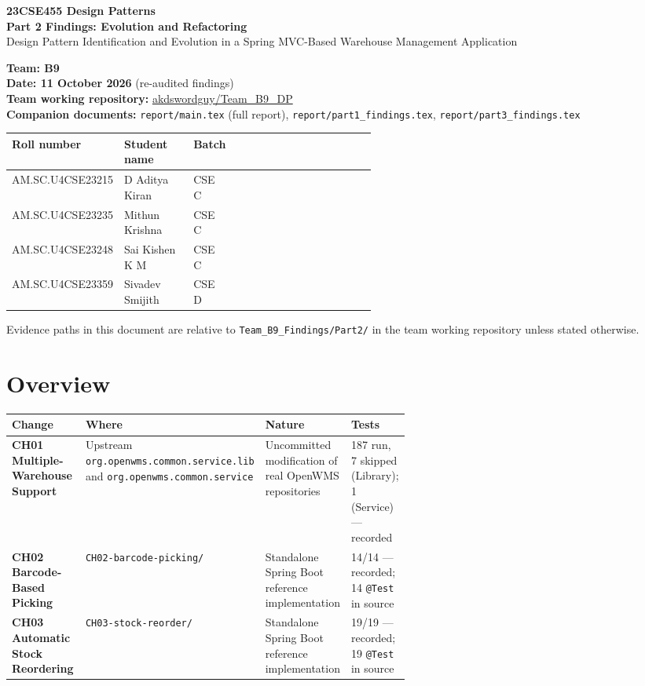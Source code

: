 \documentclass[11pt,a4paper]{article}
\title{}
\author{}
\date{}
\newcommand{\code}[1]{\nolinkurl{#1}}
\begin{document}
\begin{center}
{\Large\textbf{23CSE455 Design Patterns}}\\[4pt]
{\LARGE\textbf{Part 2 Findings: Evolution and Refactoring}}\\[6pt]
{\large Design Pattern Identification and Evolution in a Spring MVC-Based Warehouse Management Application}
\end{center}

\textbf{Team: B9}\\
\textbf{Date: 11 October 2026} (re-audited findings)\\
\textbf{Team working repository:} \href{https://github.com/akdswordguy/Team_B9_DP}{akdswordguy/Team\_B9\_DP}\\
\textbf{Companion documents:} \code{report/main.tex} (full report), \code{report/part1_findings.tex}, \code{report/part3_findings.tex}


\begin{tabularx}{\linewidth}{@{}P{0.25\linewidth}P{0.19\linewidth}P{0.10\linewidth}X@{}}
\toprule
Roll number & Student name & Batch \\
\midrule
AM.SC.U4CSE23215 & D Aditya Kiran & CSE C \\
AM.SC.U4CSE23235 & Mithun Krishna & CSE C \\
AM.SC.U4CSE23248 & Sai Kishen K M & CSE C\\
AM.SC.U4CSE23359 & Sivadev Smijith & CSE D \\
\bottomrule
\end{tabularx}

Evidence paths in this document are relative to \code{Team_B9_Findings/Part2/} in the team working repository unless stated otherwise.

\section{Overview}

\begin{tabularx}{\linewidth}{@{}P{0.22\linewidth}P{0.20\linewidth}YP{0.17\linewidth}@{}}
\toprule
Change & Where & Nature & Tests\\
\midrule
\textbf{CH01 Multiple-Warehouse Support} & Upstream \code{org.openwms.common.service.lib} and \code{org.openwms.common.service} & Uncommitted modification of real OpenWMS repositories & 187 run, 7 skipped (Library); 1 (Service) --- recorded\\
\textbf{CH02 Barcode-Based Picking} & \code{CH02-barcode-picking/} & Standalone Spring Boot reference implementation & 14/14 --- recorded; 14 \code{@Test} in source\\
\textbf{CH03 Automatic Stock Reordering} & \code{CH03-stock-reorder/} & Standalone Spring Boot reference implementation & 19/19 --- recorded; 19 \code{@Test} in source\\
\bottomrule
\end{tabularx}
\end{document}
